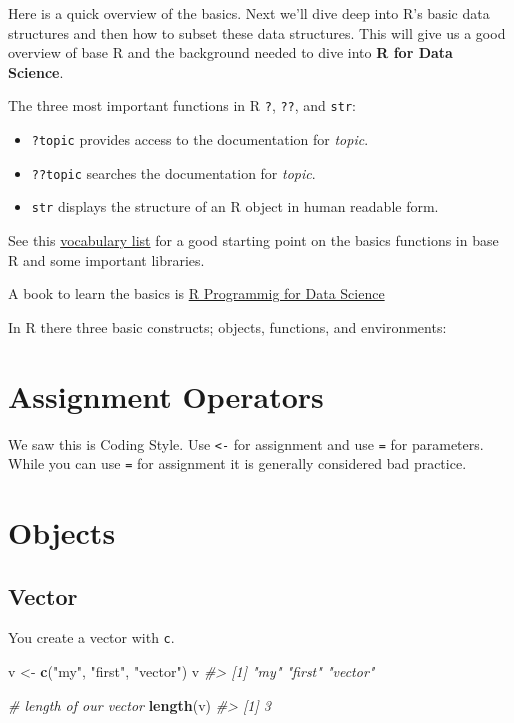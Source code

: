\documentclass[]{book}
\newenvironment{Shaded}{\begin{snugshade}}{\end{snugshade}}
\newcommand{\KeywordTok}[1]{\textcolor[rgb]{0.13,0.29,0.53}{\textbf{#1}}}
\newcommand{\StringTok}[1]{\textcolor[rgb]{0.31,0.60,0.02}{#1}}
\newcommand{\CommentTok}[1]{\textcolor[rgb]{0.56,0.35,0.01}{\textit{#1}}}
\newcommand{\NormalTok}[1]{#1}
\providecommand{\tightlist}{%
  \setlength{\itemsep}{0pt}\setlength{\parskip}{0pt}}
\theoremstyle{definition}
\theoremstyle{definition}
\theoremstyle{definition}
\theoremstyle{remark}
\begin{document}
Here is a quick overview of the basics. Next we'll dive deep into R's
basic data structures and then how to subset these data structures. This
will give us a good overview of base R and the background needed to dive
into \textbf{R for Data Science}.

The three most important functions in R \texttt{?}, \texttt{??}, and
\texttt{str}:

\begin{itemize}
\tightlist
\item
  \texttt{?topic} provides access to the documentation for \emph{topic}.
\item
  \texttt{??topic} searches the documentation for \emph{topic}.
\item
  \texttt{str} displays the structure of an R object in human readable
  form.
\end{itemize}

See this \href{http://adv-r.had.co.nz/Vocabulary.html}{vocabulary list}
for a good starting point on the basics functions in base R and some
important libraries.

A book to learn the basics is
\href{https://bookdown.org/rdpeng/rprogdatascience/}{R Programmig for
Data Science}

In R there three basic constructs; objects, functions, and environments:

\section{Assignment Operators}\label{assignment-operators}

We saw this is Coding Style. Use \texttt{\textless{}-} for assignment
and use \texttt{=} for parameters. While you can use \texttt{=} for
assignment it is generally considered bad practice.

\section{Objects}\label{objects}

\subsection{Vector}\label{vector}

You create a vector with \texttt{c}.

\begin{Shaded}
\begin{Highlighting}[]
\NormalTok{v <-}\StringTok{ }\KeywordTok{c}\NormalTok{(}\StringTok{"my"}\NormalTok{, }\StringTok{"first"}\NormalTok{, }\StringTok{"vector"}\NormalTok{)}
\NormalTok{v}
\CommentTok{#> [1] "my"     "first"  "vector"}

\CommentTok{# length of our vector}
\KeywordTok{length}\NormalTok{(v)}
\CommentTok{#> [1] 3}
\end{Highlighting}
\end{Shaded}
\end{document}

